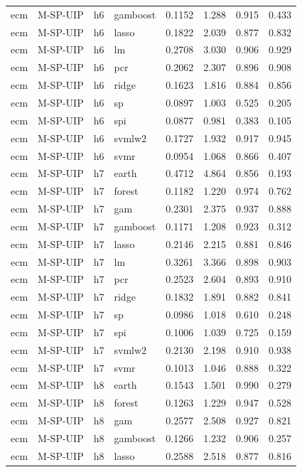 \begin{ThreePartTable}
\begin{longtable}[t]{llclcccc}
ecm & M-SP-UIP & h6 & gamboost & 0.1152 & 1.288 & 0.915 & 0.433\\
ecm & M-SP-UIP & h6 & lasso & 0.1822 & 2.039 & 0.877 & 0.832\\
ecm & M-SP-UIP & h6 & lm & 0.2708 & 3.030 & 0.906 & 0.929\\
ecm & M-SP-UIP & h6 & pcr & 0.2062 & 2.307 & 0.896 & 0.908\\
ecm & M-SP-UIP & h6 & ridge & 0.1623 & 1.816 & 0.884 & 0.856\\
ecm & M-SP-UIP & h6 & sp & 0.0897 & 1.003 & 0.525 & 0.205\\
ecm & M-SP-UIP & h6 & spi & 0.0877 & 0.981 & 0.383 & 0.105\\
ecm & M-SP-UIP & h6 & svmlw2 & 0.1727 & 1.932 & 0.917 & 0.945\\
ecm & M-SP-UIP & h6 & svmr & 0.0954 & 1.068 & 0.866 & 0.407\\
\addlinespace
ecm & M-SP-UIP & h7 & earth & 0.4712 & 4.864 & 0.856 & 0.193\\
ecm & M-SP-UIP & h7 & forest & 0.1182 & 1.220 & 0.974 & 0.762\\
ecm & M-SP-UIP & h7 & gam & 0.2301 & 2.375 & 0.937 & 0.888\\
ecm & M-SP-UIP & h7 & gamboost & 0.1171 & 1.208 & 0.923 & 0.312\\
ecm & M-SP-UIP & h7 & lasso & 0.2146 & 2.215 & 0.881 & 0.846\\
ecm & M-SP-UIP & h7 & lm & 0.3261 & 3.366 & 0.898 & 0.903\\
ecm & M-SP-UIP & h7 & pcr & 0.2523 & 2.604 & 0.893 & 0.910\\
ecm & M-SP-UIP & h7 & ridge & 0.1832 & 1.891 & 0.882 & 0.841\\
ecm & M-SP-UIP & h7 & sp & 0.0986 & 1.018 & 0.610 & 0.248\\
ecm & M-SP-UIP & h7 & spi & 0.1006 & 1.039 & 0.725 & 0.159\\
ecm & M-SP-UIP & h7 & svmlw2 & 0.2130 & 2.198 & 0.910 & 0.938\\
ecm & M-SP-UIP & h7 & svmr & 0.1013 & 1.046 & 0.888 & 0.322\\
\addlinespace
ecm & M-SP-UIP & h8 & earth & 0.1543 & 1.501 & 0.990 & 0.279\\
ecm & M-SP-UIP & h8 & forest & 0.1263 & 1.229 & 0.947 & 0.528\\
ecm & M-SP-UIP & h8 & gam & 0.2577 & 2.508 & 0.927 & 0.821\\
ecm & M-SP-UIP & h8 & gamboost & 0.1266 & 1.232 & 0.906 & 0.257\\
ecm & M-SP-UIP & h8 & lasso & 0.2588 & 2.518 & 0.877 & 0.816\\

\end{longtable}
\end{ThreePartTable}
